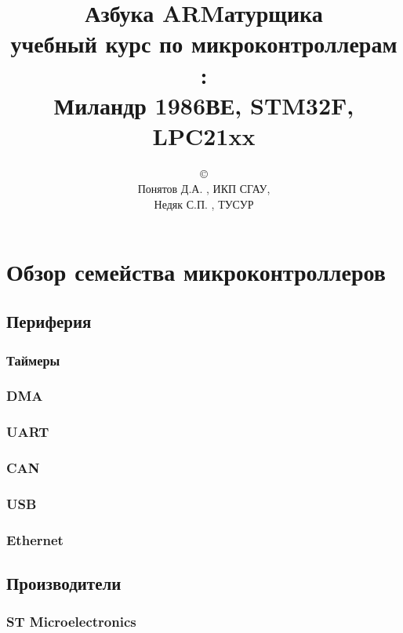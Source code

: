 \documentclass[oneside,12pt]{book}
\begin{document}
\title{\Huge{Азбука ARMатурщика}\\
\normalsize{учебный курс по микроконтроллерам \cx:\\
Миландр 1986ВЕ, STM32F, LPC21xx}}
\author{\copyright\\
Понятов Д.А. , ИКП СГАУ, \\
Недяк С.П. , ТУСУР
}
\maketitle
\tableofcontents
\listoflab

\part{Обзор семейства микроконтроллеров \cx}



\section{\cx}
\chapter{Периферия}
\section{Таймеры}
\section{DMA}
\section{UART}
\section{CAN}
\section{USB}
\section{Ethernet}
\chapter{Производители}
\section{ST Microelectronics}
\end{document}
